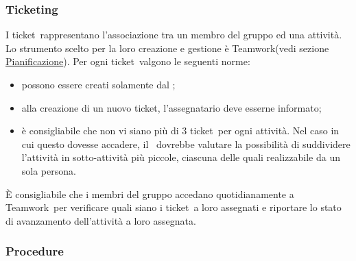 \documentclass[../NormeProgetto.tex]{subfiles}
\begin{document}
	\subsubsection{Ticketing}
			I ticket\g\ rappresentano l'associazione tra un membro del gruppo ed una attività. Lo strumento scelto per la loro creazione e gestione è Teamwork\g (vedi sezione \hyperref[sec: Pianificazione Teamwork]{Pianificazione}). Per ogni ticket\g\ valgono le seguenti norme:
			\begin{itemize}
				\item possono essere creati solamente dal \responsabilediprogetto;
				\item alla creazione di un nuovo ticket\g, l'assegnatario deve esserne informato;
				\item è consigliabile che non vi siano più di 3 ticket\g\ per ogni attività. Nel caso in cui questo dovesse accadere, il \responsabilediprogetto\ dovrebbe valutare la possibilità di suddividere l'attività in sotto-attività più piccole, ciascuna delle quali realizzabile da un sola persona.
			\end{itemize}			 
			 È consigliabile che i membri del gruppo accedano quotidianamente a Teamwork\g\ per verificare quali siano i ticket\g\ a loro assegnati e riportare lo stato di avanzamento dell'attività a loro assegnata.

		\subsubsection{Procedure}
\end{document}
